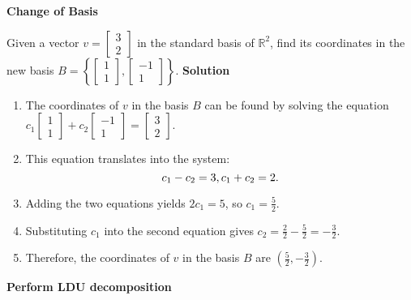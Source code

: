 \documentclass[8pt, a4paper, landscape]{extarticle}
\begin{document}
\begin{multicols*}{4}
  \textbf{Change of Basis}

  Given a vector $v = \begin{bmatrix} 3 \\ 2 \end{bmatrix}$ in the standard basis of $\mathbb{R}^2$, find its coordinates in the new basis $B = \left\{ \begin{bmatrix} 1 \\ 1 \end{bmatrix}, \begin{bmatrix} -1 \\ 1 \end{bmatrix} \right\}$.
  \textbf{Solution}
  \begin{enumerate}
    \item The coordinates of $v$ in the basis $B$ can be found by solving the equation $c_1\begin{bmatrix} 1 \\ 1 \end{bmatrix} + c_2\begin{bmatrix} -1 \\ 1 \end{bmatrix} = \begin{bmatrix} 3 \\ 2 \end{bmatrix}$.
    \item This equation translates into the system:
          \[
            c_1 - c_2 = 3, \\
            c_1 + c_2 = 2.
          \]
    \item Adding the two equations yields $2c_1 = 5$, so $c_1 = \frac{5}{2}$.
    \item Substituting $c_1$ into the second equation gives $c_2 = \frac{2}{2} - \frac{5}{2} = -\frac{3}{2}$.
    \item Therefore, the coordinates of $v$ in the basis $B$ are $\left(\frac{5}{2}, -\frac{3}{2}\right)$.
  \end{enumerate}


  \textbf{Perform LDU decomposition}


\end{multicols*}
\end{document}

